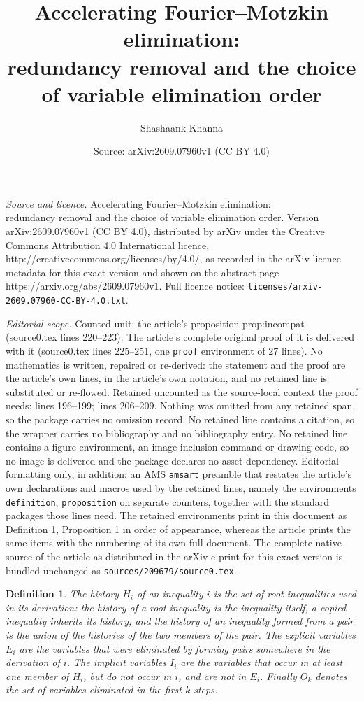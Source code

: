 \documentclass[10pt,a4paper]{amsart}
\title{Accelerating Fourier--Motzkin elimination:\\ redundancy removal and the choice of variable elimination order}
\author{Shashaank Khanna}
\date{Source: arXiv:2609.07960v1 (CC BY 4.0)}
\newtheorem{definition}{Definition}
\begin{document}
\maketitle

\noindent\emph{Source and licence.} Accelerating Fourier--Motzkin elimination:\\ redundancy removal and the choice of variable elimination order. Version arXiv:2609.07960v1 (CC BY 4.0), distributed by arXiv under the Creative Commons Attribution 4.0 International licence, http://creativecommons.org/licenses/by/4.0/, as recorded in the arXiv licence metadata for this exact version and shown on the abstract page https://arxiv.org/abs/2609.07960v1. Full licence notice: \texttt{licenses/arxiv-2609.07960-CC-BY-4.0.txt}.\par\smallskip

\noindent\textit{Editorial scope.} Counted unit: the article's proposition prop:incompat (source0.tex lines 220--223). The article's complete original proof of it is delivered with it (source0.tex lines 225--251, one \texttt{proof} environment of 27 lines). No mathematics is written, repaired or re-derived: the statement and the proof are the article's own lines, in the article's own notation, and no retained line is substituted or re-flowed.  Retained uncounted as the source-local context the proof needs: lines 196--199; lines 206--209.  Nothing was omitted from any retained span, so the package carries no omission record.  No retained line contains a citation, so the wrapper carries no bibliography and no bibliography entry.  No retained line contains a figure environment, an image-inclusion command or drawing code, so no image is delivered and the package declares no asset dependency.  Editorial formatting only, in addition: an AMS \texttt{amsart} preamble that restates the article's own declarations and macros used by the retained lines, namely the environments \texttt{definition}, \texttt{proposition} on separate counters, together with the standard packages those lines need.  The retained environments print in this document as Definition 1, Proposition 1 in order of appearance, whereas the article prints the same items with the numbering of its own full document.  The complete native source of the article as distributed in the arXiv e-print for this exact version is bundled unchanged as \texttt{sources/209679/source0.tex}.
\begin{definition}
\label{def:imbert}
The \emph{history} $H_i$ of an inequality $i$ is the set of root inequalities used in its derivation: the history of a root inequality is the inequality itself, a copied inequality inherits its history, and the history of an inequality formed from a pair is the union of the histories of the two members of the pair. The \emph{explicit variables} $E_i$ are the variables that were eliminated by forming pairs somewhere in the derivation of $i$. The \emph{implicit variables} $I_i$ are the variables that occur in at least one member of $H_i$, but do not occur in $i$, and are not in $E_i$. Finally $O_k$ denotes the set of variables eliminated in the first $k$ steps.
\end{definition}
\end{document}
